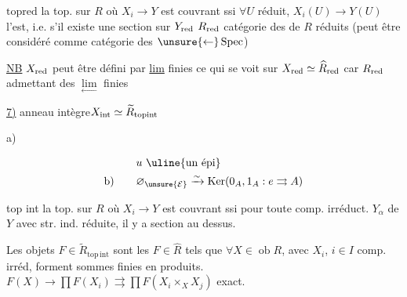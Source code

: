 
$\mathrm{topred}$ la top. sur $R$ où $X_i\to Y$ est couvrant ssi $\forall U$ réduit, $X_i(U)\to Y(U)$ l'est,
i.e. s'il existe une section sur $Y_{\rm red}$ 
$R_{\rm red}$ catégorie des   de $R$ réduits
(peut être  considéré comme catégorie des 
 $\unsure{\leftarrow}\operatorname{Spec}$)

\uline{NB} $X_{\rm red}$ peut être défini par \uline{lim} finies
ce qui se voit sur $X_{\rm red}\simeq\widehat R_{\rm red}$ car $R_{\rm red}$ admettant des $\underset{\leftarrow}{\lim}$ finies

\uline{7)} anneau intègre\quad $X_{\rm int}\simeq\widetilde R_{\mathrm{topint}}$

a)

\[
\begin{aligned}
 &u\ \text{\uline{un épi}}\\
 \text{b)}\qquad&\varnothing_{\unsure{\mathcal E}}\xrightarrow{\sim}\operatorname{Ker}(0_A,1_A:e\rightrightarrows A)
\end{aligned}
\]



top int la top. sur $R$ où $X_i\to Y$ est couvrant ssi pour toute comp. irréduct.
$Y_\alpha$ de $Y$ avec str. ind. réduite, il y a section au dessus.

Les objets $F\in\widetilde R_{\mathrm{top\,int}}$ sont les $F\in\widehat R$ tels que $\forall X\in\operatorname{ob}R$,
avec $X_i$, $i\in I$  comp. irréd,  forment sommes finies en produits.
$F(X)\to\prod F(X_i)\rightrightarrows\prod F(X_i\times_X X_j)$ exact.

